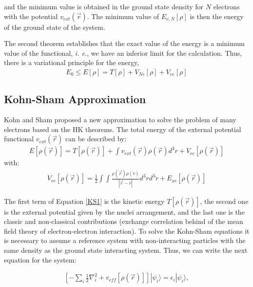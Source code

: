 \noindent and the minimum value is obtained in the ground state density for $N$
electrons with the potential $v_{ext}(\vec{r})$. The minimum value of $E_{v, N}
[\rho]$ is then the energy of the ground state of the system.

The second theorem establishes that the exact value of the energy is a minimum value
of the functional, \textit{i. e.}, we have an inferior limit for the calculation.
Thus, there is a variational principle for the energy,
%
\begin{align}
E_{0}\leq E[\rho]=T[\rho] + V_{Ne}[\rho]+V_{ee}[\rho]
\end{align}

\subsection{Kohn-Sham Approximation}\label{KSapprox}

Kohn and Sham proposed a new approximation to solve the problem of many electrons
based on the HK theorems. The total energy of the external potential functional
$v_{ext}(\vec{r})$ can be described by:
\begin{align}
E[\rho(\vec{r})] = T[\rho(\vec{r})] + \int v_{ext}(\vec{r})\rho(\vec{r})d^{3}r +
V_{ee}[\rho(\vec{r})] 
\label{KS1}
\end{align}
\noindent with:
\begin{align}
V_{ee}[\rho(\vec{r})] = \frac12 \int\int \frac{\rho(\vec{r})\rho(\acute{r})}{|\vec{r}-\acute{r}|}d^{3}r
d^{3}\acute{r} + {E}_{xc}[\rho(\vec{r})] 
\end{align}

The first term of Equation \ref{KS1} is the kinetic energy $T[\rho(\vec{r})]$,
the second one is the external potential given by the nuclei arrangement, and
the last one is the classic and non-classical contributions (exchange
correlation behind of the mean field theory of electron-electron interaction).
To solve the Kohn-Sham equations it is necessary to assume a reference system
with non-interacting particles with the same density as the ground state
interacting system. Thus, we can write the next equation for the system:

\begin{align}
\left [-\sum_{i}\frac12\nabla^{2}_{i} + v_{eff}[\rho(\vec{r})]\right ]|
\psi_{i} \rangle =
\epsilon_{i}|\psi_{i}\rangle ,
\end{align}


